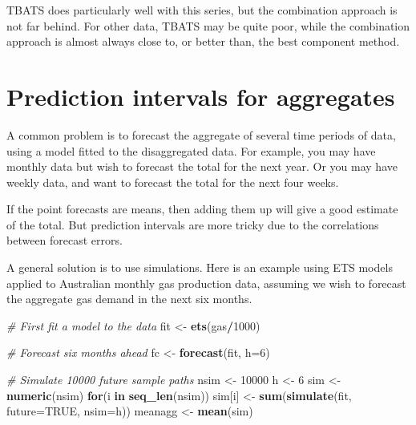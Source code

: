 \documentclass[]{book}
\newenvironment{Shaded}{\begin{snugshade}}{\end{snugshade}}
\newcommand{\CommentTok}[1]{\textcolor[rgb]{0.56,0.35,0.01}{\textit{#1}}}
\newcommand{\ControlFlowTok}[1]{\textcolor[rgb]{0.13,0.29,0.53}{\textbf{#1}}}
\newcommand{\DataTypeTok}[1]{\textcolor[rgb]{0.13,0.29,0.53}{#1}}
\newcommand{\DecValTok}[1]{\textcolor[rgb]{0.00,0.00,0.81}{#1}}
\newcommand{\KeywordTok}[1]{\textcolor[rgb]{0.13,0.29,0.53}{\textbf{#1}}}
\newcommand{\NormalTok}[1]{#1}
\newcommand{\OperatorTok}[1]{\textcolor[rgb]{0.81,0.36,0.00}{\textbf{#1}}}
\newcommand{\OtherTok}[1]{\textcolor[rgb]{0.56,0.35,0.01}{#1}}
\newcommand{\StringTok}[1]{\textcolor[rgb]{0.31,0.60,0.02}{#1}}
\begin{document}
TBATS does particularly well with this series, but the combination approach is not far behind. For other data, TBATS may be quite poor, while the combination approach is almost always close to, or better than, the best component method.

\hypertarget{aggregates}{%
\section{Prediction intervals for aggregates}\label{aggregates}}

A common problem is to forecast the aggregate of several time periods of data, using a model fitted to the disaggregated data. For example, you may have monthly data but wish to forecast the total for the next year. Or you may have weekly data, and want to forecast the total for the next four weeks.

If the point forecasts are means, then adding them up will give a good estimate of the total. But prediction intervals are more tricky due to the correlations between forecast errors.

A general solution is to use simulations. Here is an example using ETS models applied to Australian monthly gas production data, assuming we wish to forecast the aggregate gas demand in the next six months.

\begin{Shaded}
\begin{Highlighting}[]
\CommentTok{# First fit a model to the data}
\NormalTok{fit <-}\StringTok{ }\KeywordTok{ets}\NormalTok{(gas}\OperatorTok{/}\DecValTok{1000}\NormalTok{)}

\CommentTok{# Forecast six months ahead}
\NormalTok{fc <-}\StringTok{ }\KeywordTok{forecast}\NormalTok{(fit, }\DataTypeTok{h=}\DecValTok{6}\NormalTok{)}

\CommentTok{# Simulate 10000 future sample paths}
\NormalTok{nsim <-}\StringTok{ }\DecValTok{10000}
\NormalTok{h <-}\StringTok{ }\DecValTok{6} 
\NormalTok{sim <-}\StringTok{ }\KeywordTok{numeric}\NormalTok{(nsim)}
\ControlFlowTok{for}\NormalTok{(i }\ControlFlowTok{in} \KeywordTok{seq_len}\NormalTok{(nsim))}
\NormalTok{  sim[i] <-}\StringTok{ }\KeywordTok{sum}\NormalTok{(}\KeywordTok{simulate}\NormalTok{(fit, }\DataTypeTok{future=}\OtherTok{TRUE}\NormalTok{, }\DataTypeTok{nsim=}\NormalTok{h))}
\NormalTok{meanagg <-}\StringTok{ }\KeywordTok{mean}\NormalTok{(sim)}
\end{Highlighting}
\end{Shaded}
\end{document}
